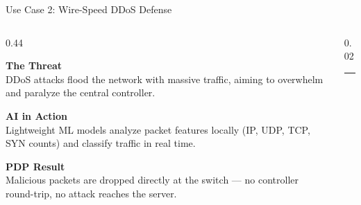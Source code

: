 {
\begin{frame}{Use Case 2: Wire-Speed DDoS Defense}
\vspace{6pt}

  \begin{columns}[T, totalwidth=\textwidth]

    \begin{column}{0.44\textwidth}

      \begin{tcolorbox}[problemcard=problemred]
        {\color{problemred}\bfseries\scriptsize The Threat}\\[2pt]
        {\footnotesize\color{HUAdark}
          DDoS attacks flood the network with
          massive traffic, aiming to overwhelm
          and paralyze the central controller.}
      \end{tcolorbox}

      \vspace{6pt}

      \begin{tcolorbox}[problemcard=HUAblue]
        {\color{HUAblue}\bfseries\scriptsize AI in Action}\\[2pt]
        {\footnotesize\color{HUAdark}
          Lightweight ML models analyze packet
          features locally (IP, UDP, TCP, SYN
          counts) and classify traffic in real time.}
      \end{tcolorbox}

      \vspace{6pt}

      \begin{tcolorbox}[problemcard=solutiongreen]
        {\color{solutiongreen}\bfseries\scriptsize PDP Result}\\[2pt]
        {\footnotesize\color{HUAdark}
          Malicious packets are dropped directly
          at the switch --- no controller round-trip,
          no attack reaches the server.}
      \end{tcolorbox}

    \end{column}

    \begin{column}{0.02\textwidth}
      \centering
      \textcolor{HUAlight}{\rule{0.5pt}{0.83\textheight}}
    \end{column}


\end{columns}
\end{frame}}
